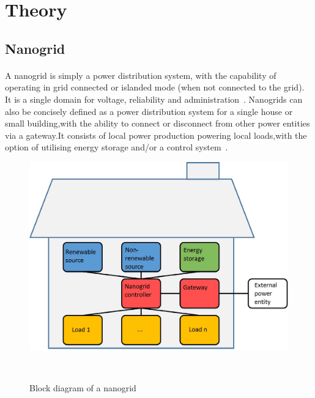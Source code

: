 \documentclass[titlepage]{article}
\begin{document}
\clearpage
\section{Theory}
\subsection{Nanogrid}
\paragraph{}A nanogrid is simply a power distribution system, with the capability of operating in grid connected or islanded mode (when not connected to the grid).
It is a single domain for voltage, reliability and administration~\cite{Bruce}.
Nanogrids can also be concisely defined as a power distribution system for a single house or small building,with the ability to connect or disconnect from other power entities via a gateway.It consists of local power production powering local loads,with the option of utilising energy storage and/or a control system~\cite{Burmester}.

\begin{figure}[h!]
\centering
\includegraphics[scale=0.4]{Nanogrid.jpg}
\caption{Block diagram of a nanogrid}~\cite{Burmester}
\label{Nanogrid}
\end{figure}
\end{document}
